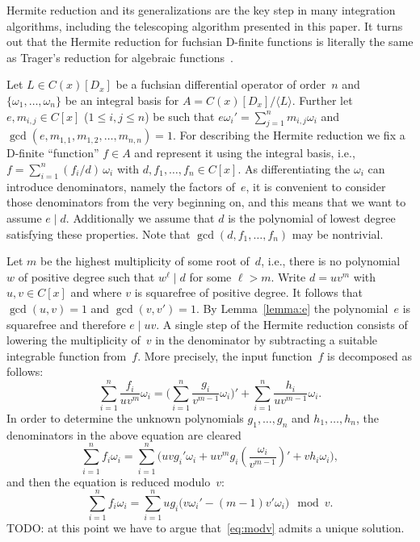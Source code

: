 \documentclass{sig-alternate}
\def\<#1>{\langle#1\rangle}
\begin{document}
Hermite reduction and its generalizations are the key step in many integration
algorithms, including the telescoping algorithm presented in this paper. It
turns out that the Hermite reduction for fuchsian D-finite functions is
literally the same as Trager's reduction for algebraic
functions~\cite{trager84}.

Let $L\in C(x)[D_x]$ be a fuchsian differential operator of order~$n$ and
$\{\omega_1,\ldots,\omega_n\}$ be an integral basis for $A=C(x)[D_x]/\<L>$.
Further let $e,m_{i,j}\in C[x]$ ($1\leq i,j\leq n$) be such that
$e\omega_i'=\sum_{j=1}^n m_{i,j}\omega_i$ and
$\gcd(e,m_{1,1},m_{1,2},\ldots,m_{n,n})=1$. For describing the Hermite
reduction we fix a D-finite ``function'' $f\in A$ and represent it using the
integral basis, i.e., $f=\sum_{i=1}^n (f_i/d)\,\omega_i$ with
$d,f_1,\ldots,f_n\in C[x]$. As differentiating the $\omega_i$ can introduce
denominators, namely the factors of~$e$, it is convenient to consider those
denominators from the very beginning on, and this means that we want to assume
$e\mid d$. Additionally we assume that $d$ is the polynomial of lowest degree
satisfying these properties. %
Note that $\gcd(d,f_1,\ldots,f_n)$ may be nontrivial.

Let $m$ be the highest multiplicity of some root of~$d$, i.e., there is no
polynomial~$w$ of positive degree such that $w^\ell\mid d$ for some $\ell>m$.
Write $d=uv^m$ with $u,v\in C[x]$ and where $v$ is squarefree of positive
degree.  It follows that $\gcd(u,v)=1$ and $\gcd(v,v')=1$. By
Lemma~\ref{lemma:e} the polynomial~$e$ is squarefree and therefore $e\mid uv$.
A single step of the Hermite reduction consists of lowering the multiplicity
of~$v$ in the denominator by subtracting a suitable integrable function
from~$f$. More precisely, the input function~$f$ is decomposed as follows:
\begin{equation}\label{eq:hred}
  \sum_{i=1}^n \frac{f_i}{uv^m}\omega_i =
  \biggl(\sum_{i=1}^n\frac{g_i}{v^{m-1}}\omega_i\biggr)' +
  \sum_{i=1}^n \frac{h_i}{uv^{m-1}}\omega_i.
\end{equation}
In order to determine the unknown polynomials $g_1,\ldots,g_n$ and
$h_1,\ldots,h_n$, the denominators in the above equation are cleared
\[
  \sum_{i=1}^n f_i\omega_i = \sum_{i=1}^n \biggl( uvg_i'\omega_i +
  uv^mg_i\left(\frac{\omega_i}{v^{m-1}}\right)' + vh_i\omega_i \biggr),
\]
and then the equation is reduced modulo~$v$:
\begin{equation}\label{eq:modv}
  \sum_{i=1}^n f_i\omega_i =
  \sum_{i=1}^n ug_i \bigl( v\omega_i' - (m-1)v'\omega_i \bigr) \mod v.
\end{equation}
TODO: at this point we have to argue that~\eqref{eq:modv} admits a unique solution.
\end{document}
